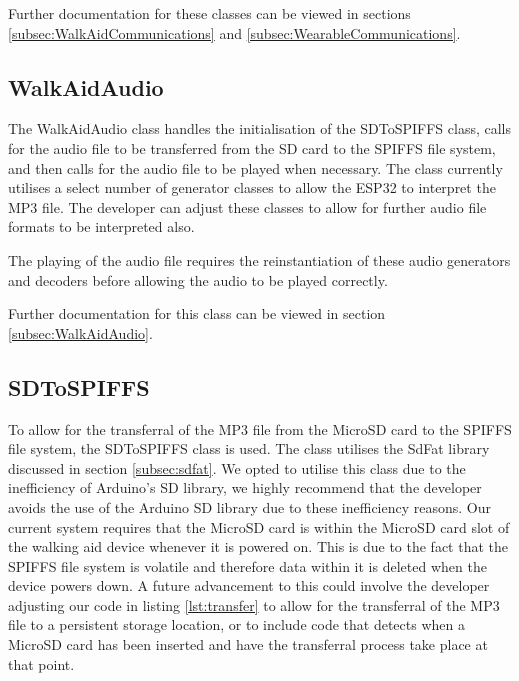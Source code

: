 				

				Further documentation for these classes can be viewed in sections \ref{subsec:WalkAidCommunications} and \ref{subsec:WearableCommunications}.

			\subsection{WalkAidAudio}

				The WalkAidAudio class handles the initialisation of the SDToSPIFFS class, calls for the audio file to be transferred from the SD card to the SPIFFS file system, and then calls for the audio file to be played when necessary. The class currently utilises a select number of generator classes to allow the ESP32 to interpret the MP3 file. The developer can adjust these classes to allow for further audio file formats to be interpreted also.

				The playing of the audio file requires the reinstantiation of these audio generators and decoders before allowing the audio to be played correctly.

				Further documentation for this class can be viewed in section \ref{subsec:WalkAidAudio}.

			\subsection{SDToSPIFFS}

				To allow for the transferral of the MP3 file from the MicroSD card to the SPIFFS file system, the SDToSPIFFS class is used. The class utilises the SdFat library discussed in section \ref{subsec:sdfat}. We opted to utilise this class due to the inefficiency of Arduino's SD library, we highly recommend that the developer avoids the use of the Arduino SD library due to these inefficiency reasons. Our current system requires that the MicroSD card is within the MicroSD card slot of the walking aid device whenever it is powered on. This is due to the fact that the SPIFFS file system is volatile and therefore data within it is deleted when the device powers down. A future advancement to this could involve the developer adjusting our code in listing \ref{lst:transfer} to allow for the transferral of the MP3 file to a persistent storage location, or to include code that detects when a MicroSD card has been inserted and have the transferral process take place at that point. 

